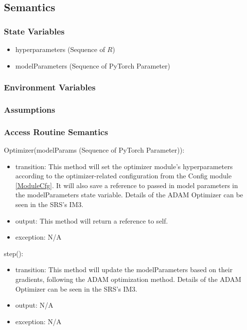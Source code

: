 \documentclass[12pt, titlepage]{article}
\begin{document}
\subsection{Semantics}

\subsubsection{State Variables}

\begin{itemize}
  \item hyperparameters (Sequence of $R$)
  \item modelParameters (Sequence of PyTorch Parameter)
\end{itemize}

\subsubsection{Environment Variables}



\subsubsection{Assumptions}



\subsubsection{Access Routine Semantics}
\noindent Optimizer(modelParams (Sequence of PyTorch Parameter)):
\begin{itemize}
\item transition: This method will set the optimizer module's hyperparameters according to the optimizer-related configuration from the Config module \ref{ModuleCfg}. It will also save a reference to passed in model parameters in the modelParameters state variable. Details of the ADAM Optimizer can be seen in the SRS's IM3.
\item output: This method will return a reference to self.
\item exception: N/A
\end{itemize}

\noindent step():
\begin{itemize}
\item transition: This method will update the modelParameters based on their gradients, following the ADAM optimization method. Details of the ADAM Optimizer can be seen in the SRS's IM3.
\item output: N/A
\item exception: N/A
\end{itemize}
\end{document}
